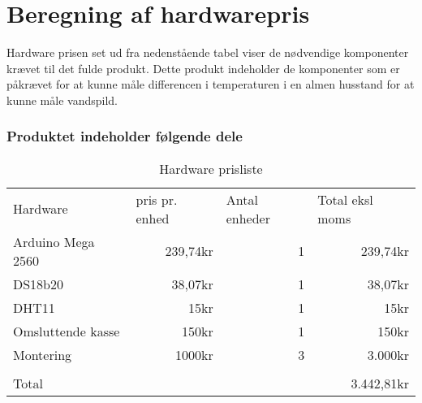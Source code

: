 \newpage
\section{Beregning af hardwarepris}
Hardware prisen set ud fra nedenstående tabel viser de nødvendige komponenter krævet til det fulde produkt. Dette produkt indeholder de komponenter som er påkrævet for at kunne måle differencen i temperaturen i en almen husstand for at kunne måle vandspild.
\subsubsection{Produktet indeholder følgende dele}  


\begin{table}[h]
\centering
\begin{tabular}{ |p{3cm}||p{3cm}|p{3cm}|p{3cm}|  }
 \hline
 \rowcolor{lightgray}\multicolumn{4}{|c|}{Pris beregning} \\
 \hline
 Hardware    & pris pr. enhed &Antal enheder&Total eksl moms\\
 \hline
 Arduino Mega 2560   & \multicolumn{1}{|r|}{239,74kr}    &\multicolumn{1}{|r|}{1}&   \multicolumn{1}{|r|}{239,74kr}\\
 \hline
 DS18b20&   \multicolumn{1}{|r|}{38,07kr}  & \multicolumn{1}{|r|}{1}   &\multicolumn{1}{|r|}{38,07kr}\\
 \hline
 DHT11 &\multicolumn{1}{|r|}{15kr} & \multicolumn{1}{|r|}{1}&  \multicolumn{1}{|r|}{15kr}\\
 \hline
  Omsluttende kasse\footnotemark  &\multicolumn{1}{|r|}{150kr} & \multicolumn{1}{|r|}{1}&  \multicolumn{1}{|r|}{150kr}\\
 \hline
  Montering &\multicolumn{1}{|r|}{1000kr} & \multicolumn{1}{|r|}{3}&  \multicolumn{1}{|r|}{3.000kr}\\
 \hline
 		&	&	&\\
 \hline
 Total	&	&	&\multicolumn{1}{|r|}{3.442,81kr}\\
 \hline 
\end{tabular}
\caption{Hardware prisliste}
\end{table}

